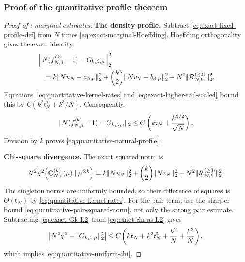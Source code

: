 \documentclass[11pt,reqno]{amsart}
\numberwithin{equation}{section}
\theoremstyle{plain}
\theoremstyle{remark}
\DeclarePairedDelimiter{\norm}{\lVert}{\rVert}
\newcommand{\Q}{{\mathbb{Q}}}
\newcommand{\be}{\beta}
\newcommand{\Chi}{\chi^2}
\newcommand{\step}[1]{\par\medskip\noindent\textbf{#1}}
\begin{document}
\subsubsection{Proof of the quantitative profile theorem}
\label{subsubsec:quantitative-profile-proof}

\begin{proof}[Proof of : marginal estimates]

\step{The density profile.}
Subtract \eqref{eq:exact-fixed-profile-def} from $N$ times \eqref{eq:exact-marginal-Hoeffding}.  Hoeffding orthogonality gives the exact identity
\begin{align}
 &\left\|N(f_{N,\be}^{(k)}-1)-G_{k,\be,\mu}\right\|_2^2\notag\\
 &\quad=k\norm{Nu_N-a_{\be,\mu}}_2^2
 +\binom{k}{2}\norm{Nv_N-b_{\be,\mu}}_2^2
 +N^2\norm{\mathcal R_{N,k}^{(\geq3)}}_2^2.
 \label{eq:exact-profile-orthogonal-error}
\end{align}
Equations~\eqref{eq:quantitative-kernel-rates} and
\eqref{eq:exact-higher-tail-scaled} bound this by
$C(k^2\mathfrak r_N^2+k^3/N)$.  Consequently,
\begin{equation}\label{eq:quantitative-uniform-profile}
 \norm{N(f_{N,\be}^{(k)}-1)-G_{k,\be,\mu}}_2
 \leq C\left(k\mathfrak r_N+\frac{k^{3/2}}{\sqrt N}\right).
\end{equation}
Division by $k$ proves \eqref{eq:quantitative-natural-profile}.


\step{Chi-square divergence.}
The exact squared norm is
\begin{equation}\label{eq:exact-chi-as-L2}
 N^2\Chi\!\left(\Q_{N,\be}^{(k)}(\mu)\mid\mu^{\otimes k}\right)
 =k\norm{Nu_N}_2^2+\binom{k}{2}\norm{Nv_N}_2^2
 +N^2\norm{\mathcal R_{N,k}^{(\geq3)}}_2^2.
\end{equation}
The singleton norms are uniformly bounded, so their difference of squares is $O(\mathfrak r_N)$ by \eqref{eq:quantitative-kernel-rates}.  For the pair term, use the sharper bound \eqref{eq:quantitative-pair-squared-norm}, not only the strong pair estimate.  Subtracting \eqref{eq:exact-Gk-L2} from \eqref{eq:exact-chi-as-L2} gives
\begin{equation}\label{eq:quantitative-chi-assembly}
 \left|N^2\Chi-\norm{G_{k,\be,\mu}}_2^2\right|
 \leq C\left(k\mathfrak r_N+k^2\mathfrak r_N^2+\frac{k^2}{N}+\frac{k^3}{N}\right),
\end{equation}
which implies \eqref{eq:quantitative-uniform-chi}.


\end{proof}
\end{document}
